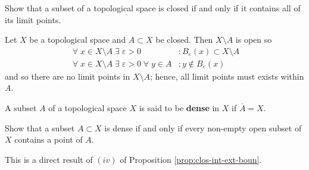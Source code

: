 \begin{problem}
	Show that a subset of a topological space is closed if and only if
	it contains all of its limit points.
\end{problem}

\begin{solution}
	Let $X$ be a topological space and $A \subset X$ be closed.
	Then $X \setminus A$ is open so
	\begin{align*}
		\;\forall\; x \in X \setminus A \;\exists\; \varepsilon > 0
		&: B_\varepsilon(x) \subset X \setminus A \\
		\;\forall\; x \in X \setminus A \;\exists\; \varepsilon > 0 
		\;\forall\; y \in A
		&: y \not\in B_\varepsilon(x)
	\end{align*}
	and so there are no limit points in $X \setminus A$; hence,
	all limit points must exists within $A$.
\end{solution}

\begin{definition}[Dense]
	A subset $A$ of a topological space $X$ is said to be \textbf{dense}
	in $X$ if $\overline{A} = X$.
\end{definition}

\begin{problem}
	Show that a subset $A \subset X$ is dense if and only if
	every non-empty open subset of $X$ contains a point of $A$.
\end{problem}

\begin{solution}
	This is a direct result of $(iv)$ of 
	Proposition \ref{prop:clos-int-ext-boun}.
\end{solution}
